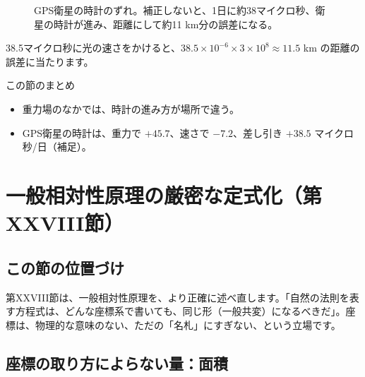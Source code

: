 \documentclass[a4paper,11pt,openany]{ltjsbook}
\begin{document}
\begin{figure}[htbp]
\centering
{}
\caption{GPS衛星の時計のずれ。補正しないと、1日に約38マイクロ秒、衛星の時計が進み、距離にして約11 km分の誤差になる。}
\end{figure}

38.5マイクロ秒に光の速さをかけると、$38.5\times10^{-6}\times3\times10^8\approx11.5$ km の距離の誤差に当たります。

\begin{pointbox}{この節のまとめ}
\begin{itemize}[leftmargin=*]
\item 重力場のなかでは、時計の進み方が場所で違う。
\item GPS衛星の時計は、重力で $+45.7$、速さで $-7.2$、差し引き $+38.5$ マイクロ秒/日（補足）。
\end{itemize}
\end{pointbox}

\chapter{一般相対性原理の厳密な定式化（第XXVIII節）}

\section{この節の位置づけ}

第XXVIII節は、一般相対性原理を、より正確に述べ直します。「自然の法則を表す方程式は、どんな座標系で書いても、同じ形（一般共変）になるべきだ」。座標は、物理的な意味のない、ただの「名札」にすぎない、という立場です。

\section{座標の取り方によらない量：面積}
\end{document}
